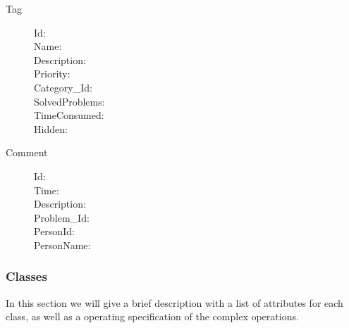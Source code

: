 \begin{description}
\item[Tag]\hfill
\begin{description}
\item[Id:]
\item[Name:]
\item[Description:]
\item[Priority:]
\item[Category_Id:]
\item[SolvedProblems:]
\item[TimeConsumed:]
\item[Hidden:]
\end{description}
\end{description}

\begin{description}
\item[Comment]\hfill
\begin{description}
\item[Id:]
\item[Time:]
\item[Description:]
\item[Problem_Id:]
\item[PersonId:]
\item[PersonName:]
\end{description}
\end{description}

\subsubsection{Classes}
In this section we will give a brief description with a list of attributes for each class, as well as a operating specification of the complex operations.